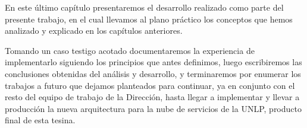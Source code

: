En este último capítulo presentaremos el desarrollo realizado como parte del presente trabajo, en el cual llevamos al plano práctico los conceptos que hemos analizado y explicado en los capítulos anteriores.

Tomando un caso testigo acotado documentaremos la experiencia de implementarlo siguiendo los principios que antes definimos, luego escribiremos las conclusiones obtenidas del análisis y desarrollo, y terminaremos por enumerar los trabajos a futuro que dejamos planteados para continuar, ya en conjunto con el resto del equipo de trabajo de la Dirección, hasta llegar a implementar y llevar a producción la nueva arquitectura para la nube de servicios de la UNLP, producto final de esta tesina.
